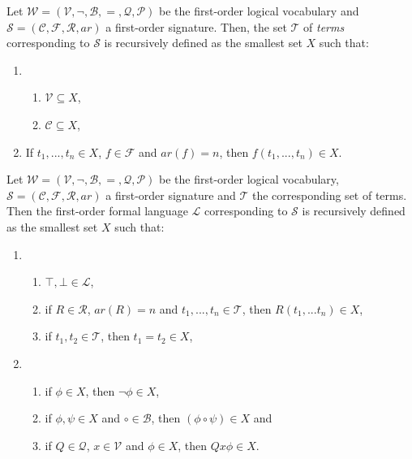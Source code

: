 \begin{definition}
    Let $\mathcal{W} = (\mathcal{V},\neg,\mathcal{B},=,\mathcal{Q},\mathcal{P})$ be the first-order logical vocabulary and $\mathcal{S} = (\mathcal{C},\mathcal{F},\mathcal{R},ar)$ a first-order signature. Then, the set $\mathcal{T}$ of \textit{terms} corresponding to $\mathcal{S}$ is recursively defined as the smallest set $X$ such that:
    \begin{enumerate}
        \item \begin{enumerate}
            \item $\mathcal{V} \subseteq X$,
            \item $\mathcal{C} \subseteq X$,
        \end{enumerate}
        \item If $t_1,...,t_n \in X$, $f \in \mathcal{F}$ and $ar(f) = n$, then $f(t_1,...,t_n) \in X$.
    \end{enumerate}
\end{definition}

\begin{definition}
    Let $\mathcal{W} = (\mathcal{V},\neg,\mathcal{B},=,\mathcal{Q},\mathcal{P})$ be the first-order logical vocabulary, $\mathcal{S} = (\mathcal{C},\mathcal{F},\mathcal{R},ar)$ a first-order signature and $\mathcal{T}$ the corresponding set of terms. Then the first-order formal language $\mathcal{L}$ corresponding to $\mathcal{S}$ is recursively defined as the smallest set $X$ such that:
    \begin{enumerate}
        \item \begin{enumerate}
            \item $\top,\bot \in \mathcal{L}$,
            \item if $R \in \mathcal{R}$, $ar(R) = n$ and $t_1,...,t_n \in \mathcal{T}$, then $R(t_1,...t_n) \in X$,
            \item if $t_1,t_2 \in \mathcal{T}$, then $t_1 = t_2 \in X$, 
        \end{enumerate}
        \item \begin{enumerate}
            \item if $\phi \in X$, then $\neg \phi \in X$,
            \item if $\phi, \psi \in X$ and $\circ \in \mathcal{B}$, then $(\phi \circ \psi) \in X$ and
            \item if $Q \in \mathcal{Q}$, $x \in \mathcal{V}$ and $\phi \in X$, then $Qx\phi \in X$.
        \end{enumerate}
    \end{enumerate}
\end{definition}

